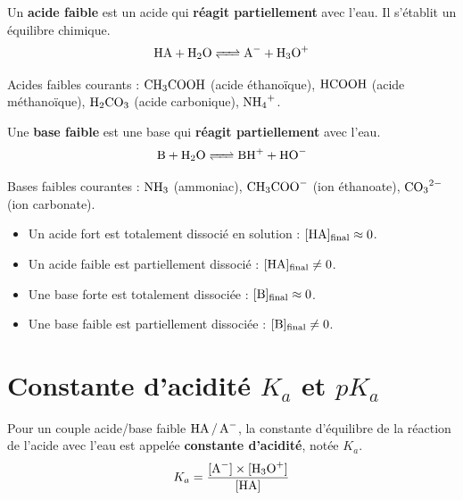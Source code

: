 \begin{definition}
Un \textbf{acide faible} est un acide qui \textbf{réagit partiellement} avec l'eau. Il s'établit un équilibre chimique.
\[
\ce{HA + H2O <=> A- + H3O+}
\]
\end{definition}

\begin{exemple}
Acides faibles courants : $\ce{CH3COOH}$ (acide éthanoïque), $\ce{HCOOH}$ (acide méthanoïque), $\ce{H2CO3}$ (acide carbonique), $\ce{NH4+}$.
\end{exemple}

\begin{definition}
Une \textbf{base faible} est une base qui \textbf{réagit partiellement} avec l'eau.
\[
\ce{B + H2O <=> BH+ + HO-}
\]
\end{definition}

\begin{exemple}
Bases faibles courantes : $\ce{NH3}$ (ammoniac), $\ce{CH3COO-}$ (ion éthanoate), $\ce{CO3^2-}$ (ion carbonate).
\end{exemple}

\begin{aretenir}
\begin{itemize}
    \item Un acide fort est totalement dissocié en solution : $[\ce{HA}]_{\text{final}} \approx 0$.
    \item Un acide faible est partiellement dissocié : $[\ce{HA}]_{\text{final}} \neq 0$.
    \item Une base forte est totalement dissociée : $[\ce{B}]_{\text{final}} \approx 0$.
    \item Une base faible est partiellement dissociée : $[\ce{B}]_{\text{final}} \neq 0$.
\end{itemize}
\end{aretenir}

\section{Constante d'acidité $K_a$ et $pK_a$}

\begin{definition}
Pour un couple acide/base faible $\ce{HA / A-}$, la constante d'équilibre de la réaction de l'acide avec l'eau est appelée \textbf{constante d'acidité}, notée $K_a$.
\[
K_a = \frac{[\ce{A-}] \times [\ce{H3O+}]}{[\ce{HA}]}
\]
\end{definition}

